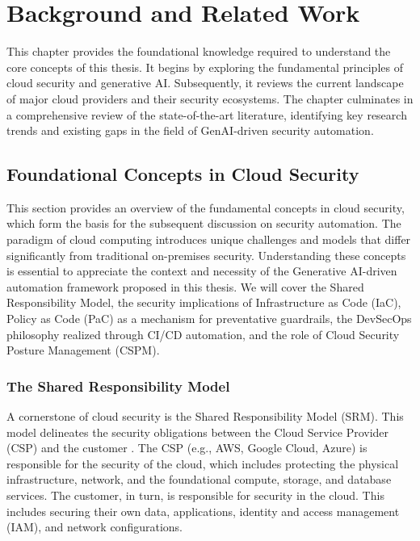 
\chapter{Background and Related Work} %
\label{chap:Background and Related Work}

This chapter provides the foundational knowledge required to understand the core concepts of this thesis. It begins by exploring the fundamental principles of cloud security and generative AI. Subsequently, it reviews the current landscape of major cloud providers and their security ecosystems. The chapter culminates in a comprehensive review of the state-of-the-art literature, identifying key research trends and existing gaps in the field of GenAI-driven security automation.

\section{Foundational Concepts in Cloud Security}
\label{sec:foundational_cloud_security}

This section provides an overview of the fundamental concepts in cloud security, which form the basis for the subsequent discussion on security automation. The paradigm of cloud computing introduces unique challenges and models that differ significantly from traditional on-premises security. Understanding these concepts is essential to appreciate the context and necessity of the Generative AI-driven automation framework proposed in this thesis. We will cover the Shared Responsibility Model, the security implications of Infrastructure as Code (IaC), Policy as Code (PaC) as a mechanism for preventative guardrails, the DevSecOps philosophy realized through CI/CD automation, and the role of Cloud Security Posture Management (CSPM).

\subsection{The Shared Responsibility Model}
A cornerstone of cloud security is the Shared Responsibility Model (SRM). This model delineates the security obligations between the Cloud Service Provider (CSP) and the customer \cite{amazon_web_services_shared_2025}. The CSP (e.g., AWS, Google Cloud, Azure) is responsible for the security of the cloud, which includes protecting the physical infrastructure, network, and the foundational compute, storage, and database services. The customer, in turn, is responsible for security in the cloud. This includes securing their own data, applications, identity and access management (IAM), and network configurations.

